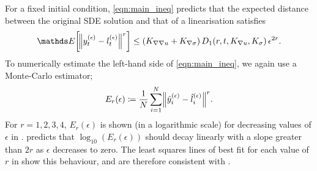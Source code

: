 For a fixed initial condition, \cref{eqn:main_ineq} predicts that the expected distance between the original SDE solution and that of a linearisation satisfies
\[
	\avg{\norm{y_t^{(\epsilon)} - l_t^{(\epsilon)}}^r} \leq \left(K_{\nabla\nabla u} + K_{\nabla\sigma}\right)D_1\!\left(r,t, K_{\nabla u}, K_\sigma\right)\epsilon^{2r}.
\]
To numerically estimate the left-hand side of \cref{eqn:main_ineq}, we again use a Monte-Carlo estimator;
\[
	E_r\!\left(\epsilon\right) \coloneqq \frac{1}{N}\sum_{i=1}^N{\norm{\hat{y}_i^{(\epsilon)} - \hat{l}_i^{(\epsilon)}}^r}.
\]
For \(r = 1,2,3,4\), \(E_r\!\left(\epsilon\right)\) is shown (in a logarithmic scale) for decreasing values of \(\epsilon\) in .
 predicts that \(\log_{10}\left(E_r\!\left(\epsilon\right)\right)\) should decay linearly with a slope greater than \(2r\) as \(\epsilon\) decreases to zero.
The least squares lines of best fit for each value of \(r\) in  show this behaviour, and are therefore consistent with .

